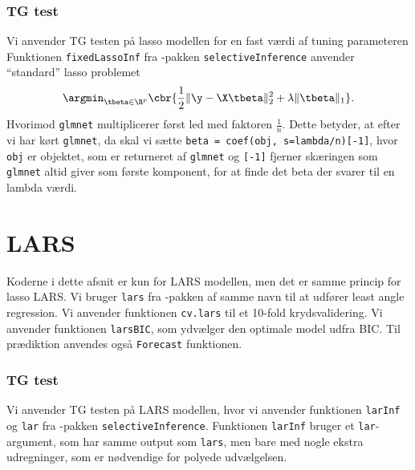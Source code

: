 \subsubsection{TG test} \label{subsubsec:inferens}
Vi anvender TG testen på lasso modellen for en fast værdi af tuning parameteren 
Funktionen \texttt{fixedLassoInf} fra \Rlang-pakken \texttt{selectiveInference}  anvender ``standard'' lasso problemet
\begin{align*}
\argmin_{\tbeta \in \R^p} \cbr{\frac{1}{2} \Vert \y - \X \tbeta \Vert_2^2 + \lambda \Vert \tbeta \Vert_1}.
\end{align*}
Hvorimod \texttt{glmnet} multiplicerer først led med faktoren \(\frac{1}{n}\).
Dette betyder, at efter vi har kørt \texttt{glmnet}, da skal vi sætte \texttt{beta = coef(obj, s=lambda/n)[-1]}, hvor \texttt{obj} er objektet, som er returneret af \texttt{glmnet} og \texttt{[-1]} fjerner skæringen som \texttt{glmnet} altid giver som første komponent, for at finde det beta der svarer til en lambda værdi.
%
%

\section{LARS} \label{subsec:lars}
Koderne i dette afsnit er kun for LARS modellen, men det er samme princip for lasso LARS. 
Vi bruger \texttt{lars} fra  \Rlang-pakken af samme navn til at udfører least angle regression.  Vi anvender funktionen \texttt{cv.lars} til et 10-fold krydsvalidering. 
Vi anvender funktionen \texttt{larsBIC}, som ydvælger den optimale model udfra BIC. 
Til prædiktion anvendes også \texttt{Forecast} funktionen.

\subsubsection{TG test} \label{subsubsec:inferens}
Vi anvender TG testen på LARS modellen, hvor vi anvender funktionen \texttt{larInf} og \texttt{lar}  fra  \Rlang-pakken \texttt{selectiveInference}. 
Funktionen \texttt{larInf} bruger et \texttt{lar}-argument, som har samme output som  \texttt{lars}, men bare med nogle ekstra udregninger, som er nødvendige for polyede udvælgelsen. 



